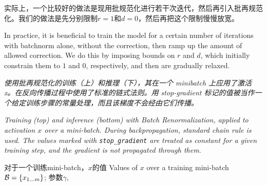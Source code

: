 实际上，一个比较好的做法是现用批规范化进行若干次迭代，然后再引入批再规范化。我们的做法是先分别限制$r=1$和$d=0$，然后再把这个限制慢慢放宽。

In practice, it is beneficial to train the model for a certain number of iterations with batchnorm alone, without the correction, then ramp up the amount of allowed correction. We do this by imposing bounds on $r$ and $d$, which initially constrain them to $1$ and $0$, respectively, and then are gradually relaxed.

\begin{algorithm}[t]
  \caption{\em 使用批再规范化的训练（上）和推理（下），其在一个 minibatch 上应用了激活 x。在反向传播过程中使用了标准的链式法则。用 stop-gradient 标记的值被当作一个给定训练步骤的常量处理，而且该梯度不会经由它们传播。
  }
  \caption{\em Training (top) and inference (bottom) with Batch Renormalization, applied to activation $x$ over a mini-batch. During backpropagation, standard chain rule is used.
  The values marked with \texttt{stop\_gradient} are treated as constant for a given training step, and the gradient is not propagated through them.
  }
\label{alg-bn}
  \begin{algorithmic}
  \REQUIRE
  对于一个训练mini-batch，$x$的值
  Values of $x$ over a training mini-batch
  $\mathcal{B}=\{x_{1\ldots m}\}$;
  参数$\gamma$,


\end{algorithmic}
\end{algorithm}
